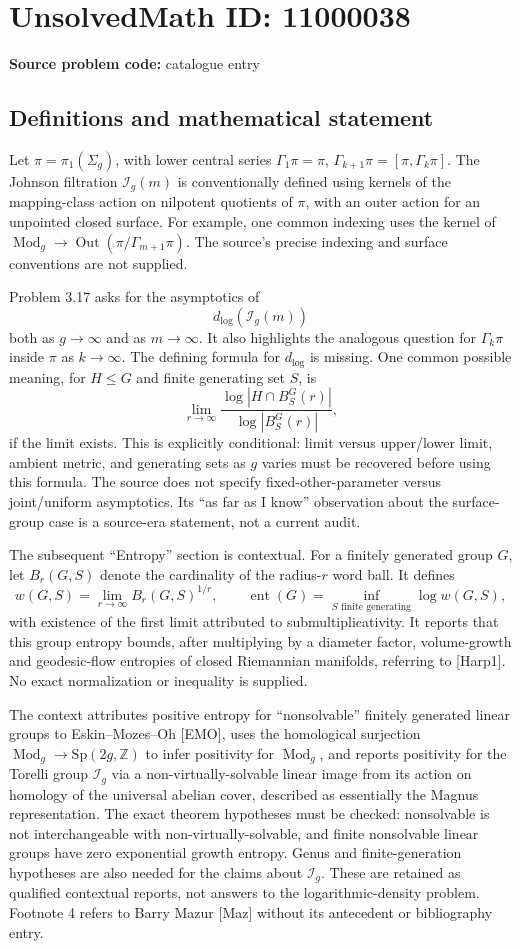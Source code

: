 \documentclass[11pt]{article}
\newcommand{\Z}{\mathbb{Z}}
\begin{document}
\section*{UnsolvedMath ID: 11000038}
\textbf{Source problem code:} catalogue entry
\subsection{Definitions and mathematical statement}
Let \(\pi=\pi_1(\Sigma_g)\), with lower central series \(\Gamma_1\pi=\pi\), \(\Gamma_{k+1}\pi=[\pi,\Gamma_k\pi]\). The Johnson filtration \(\mathcal I_g(m)\) is conventionally defined using kernels of the mapping-class action on nilpotent quotients of \(\pi\), with an outer action for an unpointed closed surface. For example, one common indexing uses the kernel of \(\operatorname{Mod}_g\to\operatorname{Out}(\pi/\Gamma_{m+1}\pi)\). The source's precise indexing and surface conventions are not supplied.

Problem 3.17 asks for the asymptotics of
\[
 d_{\log}(\mathcal I_g(m))
\]
both as \(g\to\infty\) and as \(m\to\infty\). It also highlights the analogous question for \(\Gamma_k\pi\) inside \(\pi\) as \(k\to\infty\). The defining formula for \(d_{\log}\) is missing. One common possible meaning, for \(H\le G\) and finite generating set \(S\), is
\[
 \lim_{r\to\infty}
 \frac{\log|H\cap B_S^G(r)|}{\log|B_S^G(r)|},
\]
if the limit exists. This is explicitly conditional: limit versus upper/lower limit, ambient metric, and generating sets as \(g\) varies must be recovered before using this formula. The source does not specify fixed-other-parameter versus joint/uniform asymptotics. Its ``as far as I know'' observation about the surface-group case is a source-era statement, not a current audit.

The subsequent ``Entropy'' section is contextual. For a finitely generated group \(G\), let \(B_r(G,S)\) denote the cardinality of the radius-\(r\) word ball. It defines
\[
 w(G,S)=\lim_{r\to\infty}B_r(G,S)^{1/r},\qquad
 \operatorname{ent}(G)=\inf_{S\text{ finite generating}}\log w(G,S),
\]
with existence of the first limit attributed to submultiplicativity. It reports that this group entropy bounds, after multiplying by a diameter factor, volume-growth and geodesic-flow entropies of closed Riemannian manifolds, referring to [Harp1]. No exact normalization or inequality is supplied.

The context attributes positive entropy for ``nonsolvable'' finitely generated linear groups to Eskin--Mozes--Oh [EMO], uses the homological surjection \(\operatorname{Mod}_g\to\mathrm{Sp}(2g,\Z)\) to infer positivity for \(\operatorname{Mod}_g\), and reports positivity for the Torelli group \(\mathcal I_g\) via a non-virtually-solvable linear image from its action on homology of the universal abelian cover, described as essentially the Magnus representation. The exact theorem hypotheses must be checked: nonsolvable is not interchangeable with non-virtually-solvable, and finite nonsolvable linear groups have zero exponential growth entropy. Genus and finite-generation hypotheses are also needed for the claims about \(\mathcal I_g\). These are retained as qualified contextual reports, not answers to the logarithmic-density problem. Footnote 4 refers to Barry Mazur [Maz] without its antecedent or bibliography entry.
\end{document}
